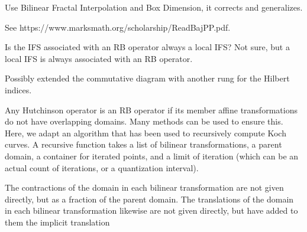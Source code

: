 \documentclass[english,11pt,letterpaper,onecolumn]{scrartcl}
\numberwithin{equation}{section}
\begin{document}
Use Bilinear Fractal Interpolation and Box Dimension, it corrects and generalizes.

See https://www.marksmath.org/scholarship/ReadBajPP.pdf.

Is the IFS associated with an RB operator always a local IFS? Not sure, but a
local IFS is always associated with an RB operator.

Possibly extended the commutative diagram with another rung for the Hilbert
indices.

Any Hutchinson operator is an RB operator if its member affine transformations
do not have overlapping domains. Many methods can be used to ensure this. Here,
we adapt an algorithm that has been used to recursively compute Koch curves. A
recursive function takes a list of bilinear transformations, a parent domain, a
container for iterated points, and a limit of iteration (which can be an actual
count of iterations, or a quantization interval).

The contractions of the domain in each bilinear transformation are not given
directly, but as a fraction of the parent domain. The translations of the domain
in each bilinear transformation likewise are not given directly, but have added
to them the implicit translation

\printbibliography
\end{document}
